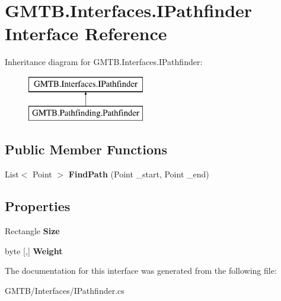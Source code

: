\hypertarget{interface_g_m_t_b_1_1_interfaces_1_1_i_pathfinder}{}\section{G\+M\+T\+B.\+Interfaces.\+I\+Pathfinder Interface Reference}
\label{interface_g_m_t_b_1_1_interfaces_1_1_i_pathfinder}
Inheritance diagram for G\+M\+T\+B.\+Interfaces.\+I\+Pathfinder\+:\begin{figure}[H]
\begin{center}
\leavevmode
\includegraphics[height=2.000000cm]{interface_g_m_t_b_1_1_interfaces_1_1_i_pathfinder}
\end{center}
\end{figure}
\subsection*{Public Member Functions}
\begin{DoxyCompactItemize}
\item 
\mbox{\label{interface_g_m_t_b_1_1_interfaces_1_1_i_pathfinder_ad95311b5fb4acddc0962de558eabc203}} 
List$<$ Point $>$ {\bfseries Find\+Path} (Point \+\_\+start, Point \+\_\+end)
\end{DoxyCompactItemize}
\subsection*{Properties}
\begin{DoxyCompactItemize}
\item 
\mbox{\label{interface_g_m_t_b_1_1_interfaces_1_1_i_pathfinder_aea63409dcd1109b884739e953b6cbad6}} 
Rectangle {\bfseries Size}
\item 
\mbox{\label{interface_g_m_t_b_1_1_interfaces_1_1_i_pathfinder_a658e85f11938b7ca0a6a302f1514ae36}} 
byte \mbox{[},\mbox{]} {\bfseries Weight}
\end{DoxyCompactItemize}


The documentation for this interface was generated from the following file\+:\begin{DoxyCompactItemize}
\item 
G\+M\+T\+B/\+Interfaces/I\+Pathfinder.\+cs\end{DoxyCompactItemize}
